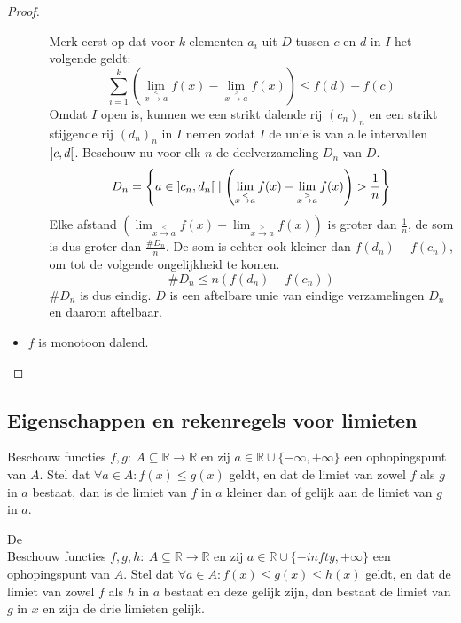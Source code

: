 \documentclass[main.tex]{subfiles}
\begin{document}
\begin{bpr}
\begin{proof}
\begin{itemize}
\begin{itemize}
        Merk eerst op dat voor $k$ elementen $a_{i}$ uit $D$ tussen $c$ en $d$ in $I$ het volgende geldt:
        \[ \sum_{i=1}^{k}\left(\lim_{x \overset{<}{\rightarrow} a}f(x)- \lim_{x \overset{>}{\rightarrow} a}f(x)\right) \le f(d) - f(c) \]
        Omdat $I$ open is, kunnen we een strikt dalende rij $(c_{n})_{n}$ en een strikt stijgende rij $(d_{n})_{n}$ in $I$ nemen zodat $I$ de unie is van alle intervallen $\interval[open]{c}{d}$.
        Beschouw nu voor elk $n$ de deelverzameling $D_{n}$ van $D$.
        \[ D_{n} = \left\{ a \in \interval[open]{c_{n}}{d_{n}} \mid \left(\lim_{x \overset{<}{\rightarrow} a}f(x)- \lim_{x \overset{>}{\rightarrow} a}f(x)\right) > \frac{1}{n} \right\} \]
        Elke afstand $\left(\lim_{x \overset{<}{\rightarrow} a}f(x)- \lim_{x \overset{>}{\rightarrow} a}f(x)\right)$ is groter dan $\frac{1}{n}$, de som is dus groter dan $\frac{\#D_{n}}{n}$.
        De som is echter ook kleiner dan $f(d_{n})-f(c_{n})$, om tot de volgende ongelijkheid te komen.
        \[ \#D_{n} \le n(f(d_{n})-f(c_{n})) \]
        $\#D_{n}$ is dus eindig.
        $D$ is een aftelbare unie van eindige verzamelingen $D_{n}$ en daarom aftelbaar.
      \end{itemize}
    \item $f$ is monotoon dalend.\\
    \end{itemize}
  \end{proof}
\end{bpr}


\subsection{Eigenschappen en rekenregels voor limieten}
\label{sec:eigensch-en-rekenr}

\begin{bpr}
  Beschouw functies $f,g:\ A \subseteq \mathbb{R} \rightarrow \mathbb{R}$ en zij $a\in \mathbb{R} \cup \{-\infty,+\infty\}$ een ophopingspunt van $A$.
  Stel dat $\forall a\in A: f(x) \le g(x)$ geldt, en dat de limiet van zowel $f$ als $g$ in $a$ bestaat, dan is de limiet van $f$ in $a$ kleiner dan of gelijk aan de limiet van $g$ in $a$.\
\end{bpr}

\begin{bst}
  De \\
  Beschouw functies $f,g,h:\ A \subseteq \mathbb{R} \rightarrow \mathbb{R}$ en zij $a\in \mathbb{R} \cup \{-infty,+\infty\}$ een ophopingspunt van $A$.
  Stel dat $\forall a\in A: f(x) \le g(x) \le h(x)$ geldt, en dat de limiet van zowel $f$ als $h$ in $a$ bestaat en deze gelijk zijn, dan bestaat de limiet van $g$ in $x$ en zijn de drie limieten gelijk.
\extra{bewijs}
\end{bst}
\end{document}
